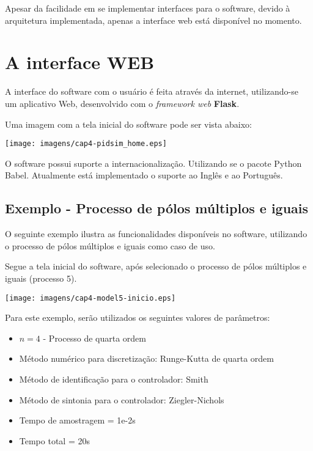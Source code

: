             Apesar da facilidade em se implementar interfaces para o software, devido à arquitetura
            implementada, apenas a interface web está disponível no momento.

\section{A interface WEB}

    A interface do software com o usuário é feita através da internet, utilizando-se um aplicativo Web,
    desenvolvido com o \textit{framework web} \textbf{Flask}.

    Uma imagem com a tela inicial do software pode ser vista abaixo:
    
    \begin{center}
        \texttt{[image: imagens/cap4-pidsim\_home.eps]}
    \end{center}

    O software possui suporte a internacionalização. Utilizando se o pacote Python Babel. Atualmente está
    implementado o suporte ao Inglês e ao Português.
    
    \subsection{Exemplo - Processo de pólos múltiplos e iguais}
    
        O seguinte exemplo ilustra as funcionalidades disponíveis no software,
        utilizando o processo de pólos múltiplos e iguais como caso de uso.
        
        Segue a tela inicial do software, após selecionado o processo de
        pólos múltiplos e iguais (processo 5).
        
        \begin{center}
            \texttt{[image: imagens/cap4-model5-inicio.eps]}
        \end{center}
        
        Para este exemplo, serão utilizados os seguintes valores de parâmetros:
        
        \begin{itemize}
            \item $n = 4$ - Processo de quarta ordem
            \item Método numérico para discretização: Runge-Kutta de quarta ordem
            \item Método de identificação para o controlador: Smith
            \item Método de sintonia para o controlador: Ziegler-Nichols
            \item Tempo de amostragem = 1e-2s
            \item Tempo total = 20s
        \end{itemize}
        

